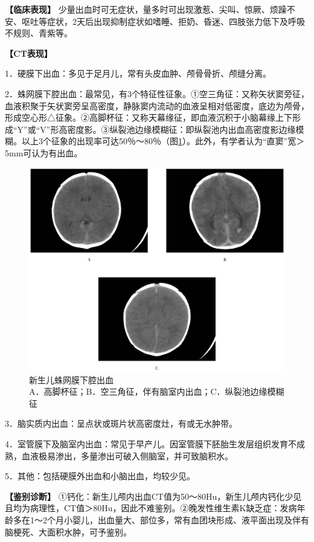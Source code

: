 \textbf{【临床表现】}
少量出血时可无症状，量多时可出现激惹、尖叫、惊厥、烦躁不安、呕吐等症状，2天后出现抑制症状如嗜睡、拒奶、昏迷、四肢张力低下及呼吸不规则、青紫等。

\textbf{【CT表现】}

1．硬膜下出血：多见于足月儿，常有头皮血肿、颅骨骨折、颅缝分离。

2．蛛网膜下腔出血：最常见，有3个特征性征象。①空三角征：又称矢状窦旁征，血液积聚于矢状窦旁呈高密度，静脉窦内流动的血液呈相对低密度，底边为颅骨，形成空心形△征象。②高脚杯征：又称天幕缘征，即血液沉积于小脑幕缘上下形成“Y”或“V”形高密度影。③纵裂池边缘模糊征：即纵裂池内出血高密度影边缘模糊。以上3个征象的出现率可达50％～80％（图\ref{fig2-15}）。此外，有学者认为“直窦”宽＞5mm可认为有出血。

\begin{figure}[!htbp]
 {\centering
 \includegraphics[width=.7\textwidth,height=\textheight,keepaspectratio]{./images/Image00031.jpg}
 \captionsetup{justification=centering}
 \caption{新生儿蛛网膜下腔出血\\{\small  A．高脚杯征；B．空三角征，伴有脑室内出血；C．纵裂池边缘模糊征}}
 \label{fig2-15}}
  \end{figure} 



3．脑实质内出血：呈点状或斑片状高密度灶，有或无水肿带。

4．室管膜下及脑室内出血：常见于早产儿。因室管膜下胚胎生发层组织发育不成熟，血液极易渗出，多量渗出可破入侧脑室，并可致脑积水。

5．其他：包括硬膜外出血和小脑出血，均较少见。

\textbf{【鉴别诊断】}
①钙化：新生儿颅内出血CT值为50～80Hu，新生儿颅内钙化少见且均为病理性，CT值＞80Hu，因此不难鉴别。②晚发性维生素K缺乏症：发病年龄多在1～2个月小婴儿，出血量大、部位多，常有血团块形成、液平面出现及伴有脑梗死、大面积水肿，可予鉴别。


